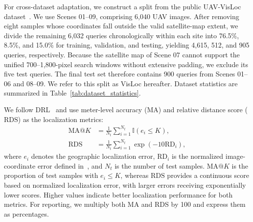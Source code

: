 \documentclass[runningheads]{llncs}
\begin{document}
For cross-dataset adaptation, we construct a split from the public UAV-VisLoc dataset~\cite{xu2024uavvisloc}. We use Scenes 01--09, comprising 6,040 UAV images. After removing eight samples whose coordinates fall outside the valid satellite-map extent, we divide the remaining 6,032 queries chronologically within each site into 76.5\%, 8.5\%, and 15.0\% for training, validation, and testing, yielding 4,615, 512, and 905 queries, respectively. Because the satellite map of Scene 07 cannot support the unified 700--1,800-pixel search windows without extensive padding, we exclude its five test queries. The final test set therefore contains 900 queries from Scenes 01--06 and 08--09. We refer to this split as VisLoc hereafter. Dataset statistics are summarized in Table~\ref{tab:dataset_statistics}.

\begin{table}[!t]
\centering
\caption{Dataset statistics for UL14 and VisLoc benchmark.}
\label{tab:dataset_statistics}
\scriptsize
\renewcommand{\arraystretch}{1.08}
\setlength{\tabcolsep}{2.0pt}
\end{table}

We follow DRL~\cite{dai2026drl} and use meter-level accuracy ($\mathrm{MA}$) and relative distance score ($\mathrm{RDS}$) as the localization metrics:
\begin{equation}
\begin{aligned}
\mathrm{MA@}K &= \frac{1}{N_t}\sum_{i=1}^{N_t}
\mathbb{I}(e_i \leq K),\\
\mathrm{RDS} &= \frac{1}{N_t}\sum_{i=1}^{N_t}
\exp\!\left(-10\mathrm{RD}_i\right),
\end{aligned}
\label{eq:localization_metrics}
\end{equation}
where $e_i$ denotes the geographic localization error, $\mathrm{RD}_i$ is the normalized image-coordinate error defined in~\cite{dai2026drl}, and $N_t$ is the number of test samples. $\mathrm{MA@}K$ is the proportion of test samples with $e_i \leq K$, whereas $\mathrm{RDS}$ provides a continuous score based on normalized localization error, with larger errors receiving exponentially lower scores. Higher values indicate better localization performance for both metrics. For reporting, we multiply both MA and RDS by 100 and express them as percentages.
\end{document}
